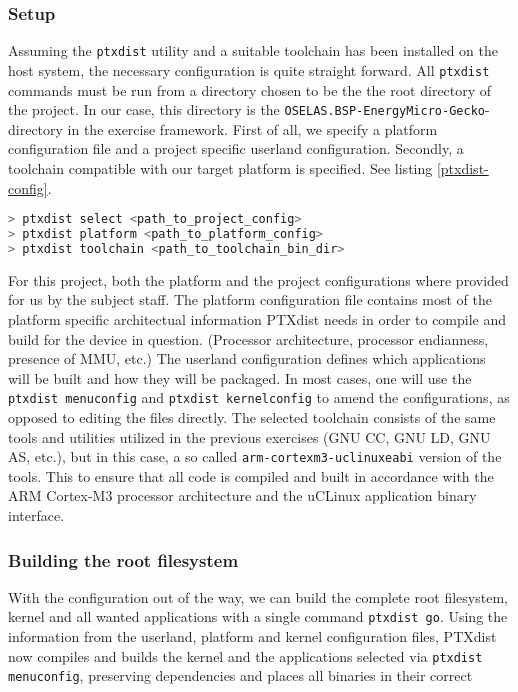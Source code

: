 \subsubsection{Setup}

Assuming the \texttt{ptxdist} utility and a suitable toolchain has been installed on the host system, the necessary configuration is quite straight forward. All \texttt{ptxdist} commands must be run from a directory chosen to be the the root directory of the project. In our case, this directory is the \texttt{OSELAS.BSP-EnergyMicro-Gecko}-directory in the exercise framework. First of all, we specify a platform configuration file and a project specific userland configuration. Secondly, a toolchain compatible with our target platform is specified. See listing \ref{ptxdist-config}.

\begin{lstlisting}[language=C, label=ptxdist-config, caption=Config]
> ptxdist select <path_to_project_config>
> ptxdist platform <path_to_platform_config>
> ptxdist toolchain <path_to_toolchain_bin_dir>
\end{lstlisting}

For this project, both the platform and the project configurations where provided for us by the subject staff. The platform configuration file contains most of the platform specific architectual information PTXdist needs in order to compile and build for the device in question. (Processor architecture, processor endianness, presence of MMU, etc.) The userland configuration defines which applications will be built and how they will be packaged. In most cases, one will use the \texttt{ptxdist menuconfig} and \texttt{ptxdist kernelconfig} to amend the configurations, as opposed to editing the files directly. The selected toolchain consists of the same tools and utilities utilized in the previous exercises (GNU CC, GNU LD, GNU AS, etc.), but in this case, a so called \texttt{arm-cortexm3-uclinuxeabi} version of the tools. This to ensure that all code is compiled and built in accordance with the ARM Cortex-M3 processor architecture and the uCLinux application binary interface.

\subsubsection{Building the root filesystem}

With the configuration out of the way, we can build the complete root filesystem, kernel and all wanted applications with a single command \texttt{ptxdist go}. Using the information from the userland, platform and kernel configuration files, PTXdist now compiles and builds the kernel and the applications selected via \texttt{ptxdist menuconfig}, preserving dependencies and places all binaries in their correct 
